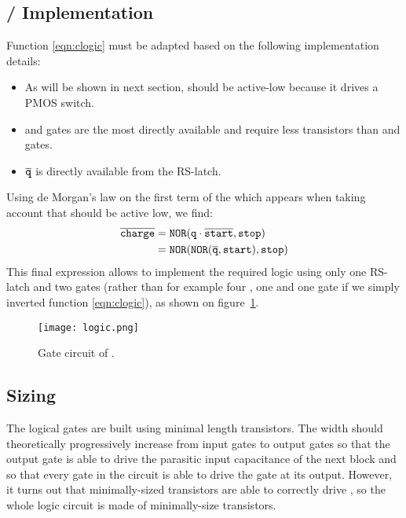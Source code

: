 \subsection{\hspace{-.3em}/ Implementation}
Function \ref{eqn:clogic} must be adapted based on the following implementation details:
\begin{itemize}
  \item As will be shown in next section,  should be active-low because it drives a PMOS switch.
  \item {} and  gates are the most directly available and require less transistors than  and  gates.
  \item $\overline{\mathtt{q}}$ is directly available from the RS-latch.
\end{itemize}

Using de Morgan's law on the first term of the  which appears when taking account that  should be active low, we find:
\begin{align*}
\signot{charge} &= \gate{nor}(\sig{q}\cdot\signot{start}, \sig{stop})\\
&=\gate{nor}(\gate{nor}(\signot{q}, \sig{start}), \sig{stop})
\end{align*}
This final expression allows to implement the required logic using only one RS-latch and two  gates (rather than for example four , one  and one  gate if we simply inverted function \ref{eqn:clogic}), as shown on figure~\ref{fig:blklogic}.
\begin{figure}
  \centering
  \texttt{[image: logic.png]}
  \caption{Gate circuit of .\label{fig:blklogic}}
\end{figure}

\subsection{Sizing}
The logical gates are built using minimal length transistors. The width should theoretically progressively increase from input gates to output gates so that the output gate is able to drive the parasitic input capacitance of the next block and so that every gate in the circuit is able to drive the gate at its output. However, it turns out that minimally-sized transistors are able to correctly drive , so the whole logic circuit is made of minimally-size transistors.
